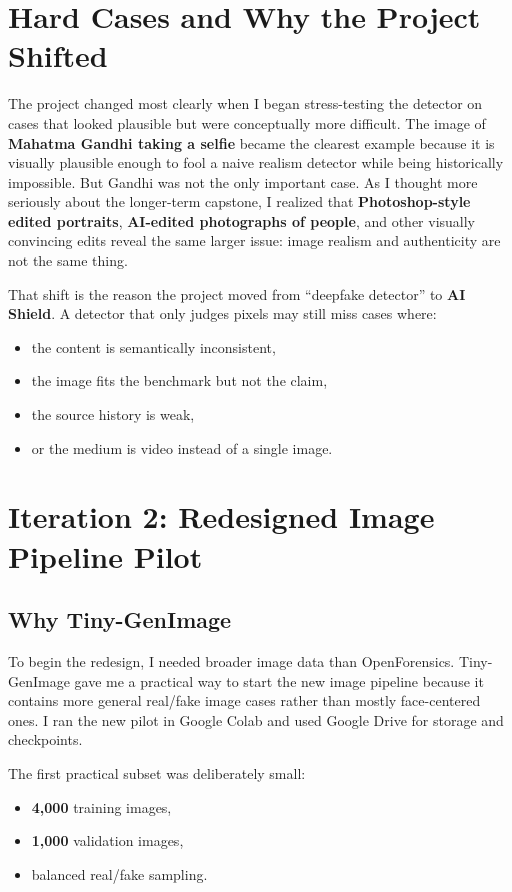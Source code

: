 \documentclass[11pt]{article}
\begin{document}
\section{Hard Cases and Why the Project Shifted}

The project changed most clearly when I began stress-testing the detector on cases that looked plausible but were conceptually more difficult. The image of \textbf{Mahatma Gandhi taking a selfie} became the clearest example because it is visually plausible enough to fool a naive realism detector while being historically impossible. But Gandhi was not the only important case. As I thought more seriously about the longer-term capstone, I realized that \textbf{Photoshop-style edited portraits}, \textbf{AI-edited photographs of people}, and other visually convincing edits reveal the same larger issue: image realism and authenticity are not the same thing.

That shift is the reason the project moved from ``deepfake detector'' to \textbf{AI Shield}. A detector that only judges pixels may still miss cases where:
\begin{itemize}[leftmargin=1.5em]
    \item the content is semantically inconsistent,
    \item the image fits the benchmark but not the claim,
    \item the source history is weak,
    \item or the medium is video instead of a single image.
\end{itemize}

\section{Iteration 2: Redesigned Image Pipeline Pilot}

\subsection{Why Tiny-GenImage}

To begin the redesign, I needed broader image data than OpenForensics. Tiny-GenImage gave me a practical way to start the new image pipeline because it contains more general real/fake image cases rather than mostly face-centered ones. I ran the new pilot in Google Colab and used Google Drive for storage and checkpoints.

The first practical subset was deliberately small:
\begin{itemize}[leftmargin=1.5em]
    \item \textbf{4,000} training images,
    \item \textbf{1,000} validation images,
    \item balanced real/fake sampling.
\end{itemize}
\end{document}
